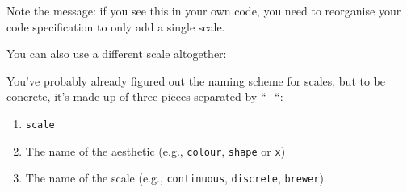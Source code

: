 \begin{Shaded}
\begin{Highlighting}[]
\OperatorTok{+}\StringTok{ }
\StringTok{  }\NormalTok{() }\OperatorTok{+}\StringTok{ }
\StringTok{  }\NormalTok{(}\NormalTok{) }\OperatorTok{+}
\StringTok{  }\NormalTok{(}\NormalTok{)}

\OperatorTok{+}\StringTok{ }
\StringTok{  }\NormalTok{() }\OperatorTok{+}\StringTok{ }
\StringTok{  }\NormalTok{(}\NormalTok{)}
\end{Highlighting}
\end{Shaded}

Note the message: if you see this in your own code, you need to
reorganise your code specification to only add a single scale.

You can also use a different scale altogether:

\begin{Shaded}
\begin{Highlighting}[]
\OperatorTok{+}\StringTok{ }
\StringTok{  }\NormalTok{(}\NormalTok{(}\OperatorTok{+}
\StringTok{  }\NormalTok{() }\OperatorTok{+}\StringTok{ }
\StringTok{  }\NormalTok{()}
\end{Highlighting}
\end{Shaded}

You've probably already figured out the naming scheme for scales, but to
be concrete, it's made up of three pieces separated by ``\_``:

\begin{enumerate}
\def\labelenumi{\arabic{enumi}.}
\tightlist
\item
  \texttt{scale}
\item
  The name of the aesthetic (e.g., \texttt{colour}, \texttt{shape} or
  \texttt{x})
\item
  The name of the scale (e.g., \texttt{continuous}, \texttt{discrete},
  \texttt{brewer}).
\end{enumerate}

